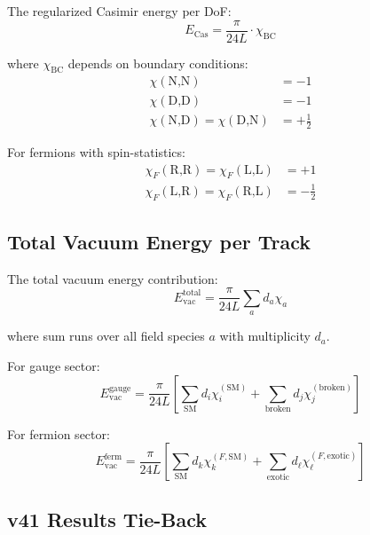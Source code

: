 \documentclass[11pt,a4paper]{article}
\begin{document}
The regularized Casimir energy per DoF:
\begin{equation}
\label{eq:casimir-formula}
E_{\text{Cas}} = \frac{\pi}{24L} \cdot \chi_{\text{BC}}
\end{equation}

where $\chi_{\text{BC}}$ depends on boundary conditions:
\begin{align}
\label{eq:chi-NN-app}
\chi(\text{N,N}) &= -1 \\
\label{eq:chi-DD-app}
\chi(\text{D,D}) &= -1 \\
\label{eq:chi-ND-app}
\chi(\text{N,D}) = \chi(\text{D,N}) &= +\frac{1}{2}
\end{align}

For fermions with spin-statistics:
\begin{align}
\label{eq:chi-RR-app}
\chi_F(\text{R,R}) = \chi_F(\text{L,L}) &= +1 \\
\label{eq:chi-LR-app}
\chi_F(\text{L,R}) = \chi_F(\text{R,L}) &= -\frac{1}{2}
\end{align}

\subsection{Total Vacuum Energy per Track}

The total vacuum energy contribution:
\begin{equation}
\label{eq:evac-total}
E_{\text{vac}}^{\text{total}} = \frac{\pi}{24L} \sum_a d_a \chi_a
\end{equation}

where sum runs over all field species $a$ with multiplicity $d_a$.

For gauge sector:
\begin{equation}
\label{eq:evac-gauge}
E_{\text{vac}}^{\text{gauge}} = \frac{\pi}{24L} \left[\sum_{\text{SM}} d_i \chi_i^{(\text{SM})} + \sum_{\text{broken}} d_j \chi_j^{(\text{broken})}\right]
\end{equation}

For fermion sector:
\begin{equation}
\label{eq:evac-ferm}
E_{\text{vac}}^{\text{ferm}} = \frac{\pi}{24L} \left[\sum_{\text{SM}} d_k \chi_k^{(F,\text{SM})} + \sum_{\text{exotic}} d_\ell \chi_\ell^{(F,\text{exotic})}\right]
\end{equation}

\subsection{v41 Results Tie-Back}
\end{document}
